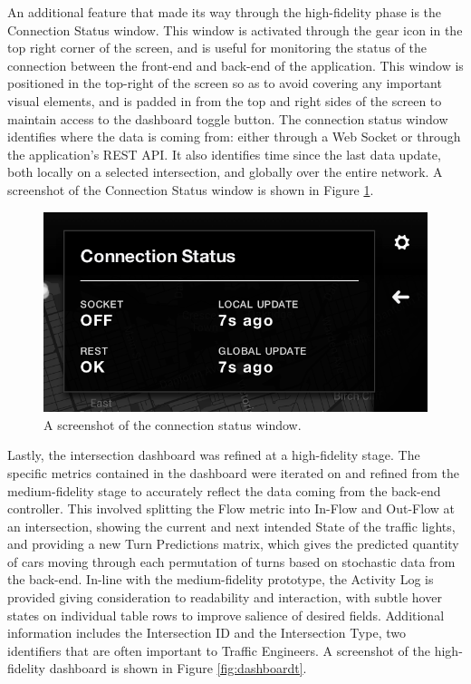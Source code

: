 \documentclass{report}
\begin{document}
An additional feature that made its way through the high-fidelity phase is the Connection Status window.
This window is activated through the gear icon in the top right corner of the screen, and is useful for monitoring the status of the connection between the front-end and back-end of the application.
This window is positioned in the top-right of the screen so as to avoid covering any important visual elements, and is padded in from the top and right sides of the screen to maintain access to the dashboard toggle button.
The connection status window identifies where the data is coming from: either through a Web Socket or through the application's REST API.
It also identifies time since the last data update, both locally on a selected intersection, and globally over the entire network.
A screenshot of the Connection Status window is shown in Figure \ref{fig:connection}.

\begin{figure}[htbp!]
  \begin{centering}
    \includegraphics[scale=0.6]{figures/connection.png}
    \caption{A screenshot of the connection status window.}
    \label{fig:connection}
  \end{centering}
\end{figure}

Lastly, the intersection dashboard was refined at a high-fidelity stage.
The specific metrics contained in the dashboard were iterated on and refined from the medium-fidelity stage to accurately reflect the data coming from the back-end controller.
This involved splitting the Flow metric into In-Flow and Out-Flow at an intersection, showing the current and next intended State of the traffic lights, and providing a new Turn Predictions matrix, which gives the predicted quantity of cars moving through each permutation of turns based on stochastic data from the back-end.
In-line with the medium-fidelity prototype, the Activity Log is provided giving consideration to readability and interaction, with subtle hover states on individual table rows to improve salience of desired fields.
Additional information includes the Intersection ID and the Intersection Type, two identifiers that are often important to Traffic Engineers.
A screenshot of the high-fidelity dashboard is shown in Figure \ref{fig:dashboardt}. \\
\end{document}
